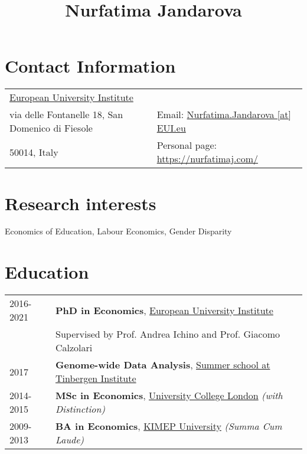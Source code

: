 \documentclass{article}
\title{ {\Large  Nurfatima Jandarova} }
\date{}
\begin{document}
    \maketitle


    \section*{Contact Information}
    \begin{table}[H]
      \begin{tabular}{ll}\href{https://www.eui.eu/}{European University Institute}&\\
        via delle Fontanelle 18, San Domenico di Fiesole&
        Email: \href{mailto:Nurfatima.Jandarova [at] EUI.eu}{Nurfatima.Jandarova [at] EUI.eu} \\
        50014, Italy& Personal page: \href{https://nurfatimaj.com/}{https://nurfatimaj.com/}
      \end{tabular}
    \end{table}

    \section*{Research interests}Economics of Education, Labour Economics, Gender Disparity

    \section*{Education}\begin{table}[H]
        \begin{tabular}{p{2cm}p{14cm}}
            2016-2021 & \textbf{PhD in Economics}, \href{https://www.eui.eu}{European University Institute}\\ & Supervised by Prof. Andrea Ichino and Prof. Giacomo Calzolari\\
            2017 & \textbf{Genome-wide Data Analysis}, \href{https://www.tinbergen.nl/home}{Summer school at Tinbergen Institute}\\
            2014-2015 & \textbf{MSc in Economics}, \href{https://www.ucl.ac.uk}{University College London}\textit{ (with Distinction) }\\
            2009-2013 & \textbf{BA in Economics}, \href{https://www.kimep.kz/en}{KIMEP University}\textit{ (Summa Cum Laude) }\\
        \end{tabular}
      \end{table}
\end{document}
